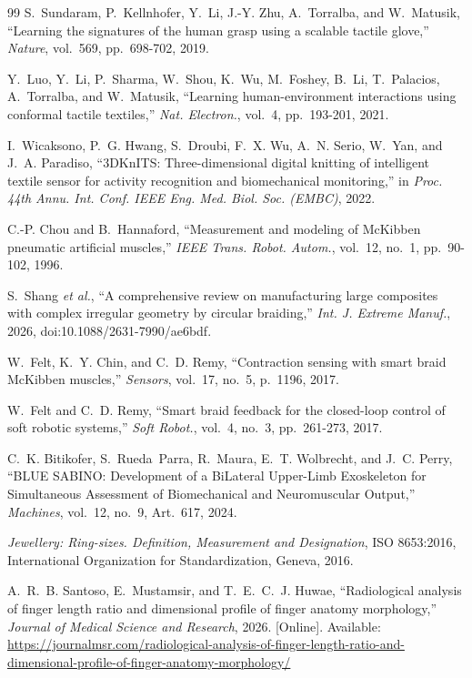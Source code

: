 \documentclass[letterpaper, 10 pt, conference]{ieeeconf}  %
\begin{document}
\begin{thebibliography}{99}
S.~Sundaram, P.~Kellnhofer, Y.~Li, J.-Y. Zhu, A.~Torralba, and W.~Matusik,
``Learning the signatures of the human grasp using a scalable tactile glove,''
\emph{Nature}, vol.~569, pp.~698-702, 2019.

Y.~Luo, Y.~Li, P.~Sharma, W.~Shou, K.~Wu, M.~Foshey, B.~Li, T.~Palacios,
A.~Torralba, and W.~Matusik,
``Learning human-environment interactions using conformal tactile textiles,''
\emph{Nat. Electron.}, vol.~4, pp.~193-201, 2021.

I.~Wicaksono, P.~G. Hwang, S.~Droubi, F.~X. Wu, A.~N. Serio, W.~Yan, and J.~A. Paradiso,
``3DKnITS: Three-dimensional digital knitting of intelligent textile sensor for
activity recognition and biomechanical monitoring,''
in \emph{Proc. 44th Annu. Int. Conf. IEEE Eng. Med. Biol. Soc. (EMBC)}, 2022.

C.-P. Chou and B.~Hannaford,
``Measurement and modeling of McKibben pneumatic artificial muscles,''
\emph{IEEE Trans. Robot. Autom.}, vol.~12, no.~1, pp.~90-102, 1996.

S.~Shang \emph{et al.},
``A comprehensive review on manufacturing large composites with complex
irregular geometry by circular braiding,''
\emph{Int. J. Extreme Manuf.}, 2026, doi:10.1088/2631-7990/ae6bdf.

W.~Felt, K.~Y. Chin, and C.~D. Remy,
``Contraction sensing with smart braid McKibben muscles,''
\emph{Sensors}, vol.~17, no.~5, p.~1196, 2017.

W.~Felt and C.~D. Remy,
``Smart braid feedback for the closed-loop control of soft robotic systems,''
\emph{Soft Robot.}, vol.~4, no.~3, pp.~261-273, 2017.

 C.~K. Bitikofer, S.~Rueda~Parra, R.~Maura, E.~T. Wolbrecht, and J.~C. Perry, ``BLUE SABINO: Development of a BiLateral Upper-Limb Exoskeleton for Simultaneous Assessment of Biomechanical and Neuromuscular Output,'' \emph{Machines}, vol.~12, no.~9, Art.~617, 2024.

 \emph{Jewellery: Ring-sizes. Definition, Measurement and Designation}, ISO 8653:2016, International Organization for Standardization, Geneva, 2016.

 A.~R.~B. Santoso, E.~Mustamsir, and T.~E.~C.~J. Huwae, ``Radiological analysis of finger length ratio and dimensional profile of finger anatomy morphology,'' \emph{Journal of Medical Science and Research}, 2026. [Online]. Available: \url{https://journalmsr.com/radiological-analysis-of-finger-length-ratio-and-dimensional-profile-of-finger-anatomy-morphology/}



\end{thebibliography}
\end{document}

